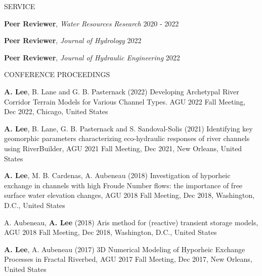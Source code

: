 \documentclass{resume_anzy} %
\begin{document}
\begin{rSection}{SERVICE}
\vspace{-2.5mm}
\item \textbf{Peer Reviewer}, \textit{Water Resources Research} \hfill{2020 - 2022}
\item \textbf{Peer Reviewer}, \textit{Journal of Hydrology} \hfill{2022}
\item \textbf{Peer Reviewer}, \textit{Journal of Hydraulic Engineering} \hfill{2022}

\end{rSection}


%



\begin{rSection}{CONFERENCE PROCEEDINGS}
\vspace{-2.5mm}
\item \textbf{A. Lee}, B. Lane and G. B. Pasternack (2022) Developing Archetypal River Corridor Terrain Models for Various Channel Types. AGU 2022 Fall Meeting, Dec 2022, Chicago, United States 
\item \textbf{A. Lee}, B. Lane, G. B. Pasternack and S. Sandoval-Solis (2021) Identifying key geomorphic parameters characterizing eco-hydraulic responses of river channels using RiverBuilder, AGU 2021 Fall Meeting, Dec 2021, New Orleans, United States 
\item \textbf{A. Lee}, M. B. Cardenas, A. Aubeneau (2018) Investigation of hyporheic exchange in channels with high Froude Number flows: the importance of free surface water elevation changes, AGU 2018 Fall Meeting, Dec 2018, Washington, D.C., United States 
\item A. Aubeneau, \textbf{A. Lee}  (2018) Aris method for (reactive) transient storage models, AGU 2018 Fall Meeting, Dec 2018, Washington, D.C., United States 
\item \textbf{A. Lee}, A. Aubeneau (2017) 3D Numerical Modeling of Hyporheic Exchange Processes in Fractal Riverbed, AGU 2017 Fall Meeting, Dec 2017, New Orleans, United States 
\end{rSection}
\end{document}

